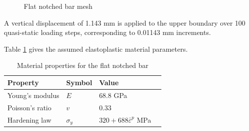 \documentclass[sn-mathphys,Numbered,draft]{sn-jnl}%
\begin{document}
\begin{figure}[htbp]
	\centering
		
		
		\caption{Flat notched bar mesh}
	\label{flat_bar_mesh}
\end{figure}

A vertical displacement of 1.143 \si{\milli\meter} is applied to the upper boundary over 100 quasi-static loading steps, corresponding to 0.01143 \si{\milli\meter} increments.

Table \ref{tab:flat_bar_mat} gives the assumed elastoplastic material parameters.
\begin{table}[htb]
	\centering
		\begin{tabular}{llll} \hline
			Property & Symbol & Value  \\ \hline 
			Young's modulus & $E$ & $68.8$ GPa \\
			Poisson's ratio & $v$ & $0.33$   \\
			Hardening law & $\sigma_y$ & $320+688\bar{\varepsilon}^p$ MPa  \\
			\hline
		\end{tabular}
	\caption{Material properties for the flat notched bar}
	\label{tab:flat_bar_mat}
\end{table}
\end{document}
